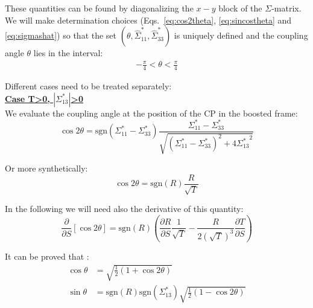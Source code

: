 These quantities can be found by diagonalizing the $x-y$ block of the $\Sigma$-matrix.
We will make determination choices (Eqs.~\ref{eq:cos2theta}, \ref{eq:sincostheta} and \ref{eq:sigmashat}) so that the set $(\theta, \hat{\Sigma}^*_{11}, \hat{\Sigma}^*_{33})$ is uniquely defined and the coupling angle $\theta$ lies in the interval:
\begin{align}
-\frac{\pi}{4}<\theta<\frac{\pi}{4}
\end{align}

Different cases need to be treated separately:
~\\

\textbf{\underline{Case T>0, $\left|\Sigma^*_{13}\right|$>0}}
~\\

We evaluate the coupling angle at the position of the CP in the boosted frame:
\begin{equation}
\cos 2\theta = \textrm{sgn} \left(\Sigma^*_{11} - \Sigma^*_{33}\right)\frac{\Sigma^*_{11} - \Sigma^*_{33}}{\sqrt{\left(\Sigma^*_{11} - \Sigma^*_{33}\right)^2 + 4 {\Sigma^*_{13}}^2 }}
\end{equation}

Or more synthetically:
\begin{equation}
\cos 2\theta = \textrm{sgn}(R)\frac{R}{\sqrt{T}}
\label{eq:cos2theta}
\end{equation}

In the following we will need also the derivative of this quantity:
\begin{equation}
\frac{\partial }{\partial S} \left[ \cos 2\theta \right] =  \textrm{sgn}(R)
\left(\frac{\partial R}{\partial S} \frac{1}{\sqrt{T}}-\frac{R}{2\left( \sqrt{T}\right)^3}\frac{\partial T}{\partial S}\right)
\end{equation}

It can be proved that \cite{beam_beam}:
\begin{align}
\cos \theta &= \sqrt{\frac{1}{2}\left(1 + \cos 2\theta \right)}\\
\sin \theta &= \textrm{sgn}(R)\textrm{sgn}(\Sigma^*_{13}) \sqrt{\frac{1}{2}\left(1 - \cos 2\theta \right)}
\label{eq:sincostheta}
\end{align}

~\\

